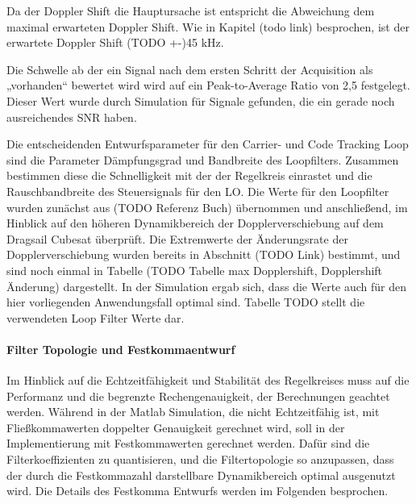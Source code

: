Da der Doppler Shift die Hauptursache ist entspricht die Abweichung dem maximal erwarteten Doppler Shift. Wie in Kapitel (todo link) besprochen, ist der erwartete Doppler Shift (TODO +-)45 kHz.

Die Schwelle ab der ein Signal nach dem ersten Schritt der Acquisition als „vorhanden“ bewertet wird wird auf ein Peak-to-Average Ratio von 2,5 festgelegt. Dieser Wert wurde durch Simulation für Signale gefunden, die ein gerade noch ausreichendes SNR haben.




Die entscheidenden Entwurfsparameter für den Carrier- und Code Tracking Loop sind die Parameter Dämpfungsgrad und Bandbreite des Loopfilters. Zusammen bestimmen diese die Schnelligkeit mit der der Regelkreis einrastet und die Rauschbandbreite des Steuersignals für den LO.
Die Werte für den Loopfilter wurden zunächst aus (TODO Referenz Buch) übernommen und anschließend, im Hinblick auf den höheren Dynamikbereich der Dopplerverschiebung auf dem Dragsail Cubesat überprüft. Die Extremwerte der Änderungsrate der Dopplerverschiebung wurden bereits in Abschnitt (TODO Link) bestimmt, und sind noch einmal in Tabelle (TODO Tabelle max Dopplershift, Dopplershift Änderung) dargestellt.
In der Simulation ergab sich, dass die Werte auch für den hier vorliegenden Anwendungsfall optimal sind. Tabelle TODO stellt die verwendeten Loop Filter Werte dar.

\paragraph{Filter Topologie und Festkommaentwurf}
Im Hinblick auf die Echtzeitfähigkeit und Stabilität des Regelkreises muss auf die Performanz und die begrenzte Rechengenauigkeit, der Berechnungen geachtet werden. Während in der Matlab Simulation, die nicht Echtzeitfähig ist, mit Fließkommawerten doppelter Genauigkeit gerechnet wird, soll in der Implementierung mit Festkommawerten gerechnet werden.
Dafür sind die Filterkoeffizienten zu quantisieren, und die Filtertopologie so anzupassen, dass der durch die Festkommazahl darstellbare Dynamikbereich optimal ausgenutzt wird. Die Details des Festkomma Entwurfs werden im Folgenden besprochen.


